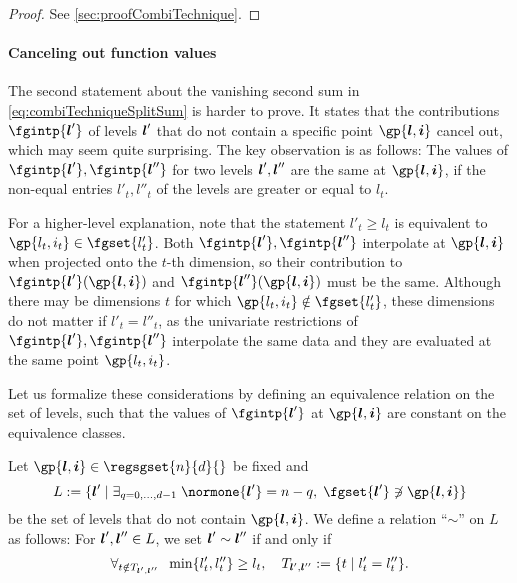 \begin{proof}
  See \cref{sec:proofCombiTechnique}.
\end{proof}

\paragraph{Canceling out function values}

The second statement about the vanishing second sum in
\eqref{eq:combiTechniqueSplitSum} is harder to prove.
It states that the contributions $\fgintp{\*l'}$ of levels ${\boldsymbol{l}}'$
that do not contain a specific point $\gp{\*l,\*i}$ cancel out,
which may seem quite surprising.
The key observation is as follows:
The values of $\fgintp{\*l'}, \fgintp{\*l''}$ for two levels
${\boldsymbol{l}}', {\boldsymbol{l}}''$ are the same at $\gp{\*l,\*i}$,
if the non-equal entries $l'_t, l''_t$ of the levels are
greater or equal to $l_t$.

For a higher-level explanation,
note that the statement $l'_t \ge l_t$ is equivalent to
$\gp{l_t,i_t} \in \fgset{l'_t}$.
Both $\fgintp{\*l'}, \fgintp{\*l''}$ interpolate at
$\gp{\*l,\*i}$ when projected onto the $t$-th dimension,
so their contribution to $\fgintp{\*l'}(\gp{\*l,\*i})$ and
$\fgintp{\*l''}(\gp{\*l,\*i})$ must be the same.
Although there may be dimensions $t$ for which
$\gp{l_t,i_t} \notin \fgset{l'_t}$,
these dimensions do not matter if $l'_t = l''_t$,
as the univariate restrictions of $\fgintp{\*l'}, \fgintp{\*l''}$
interpolate the same data and they are evaluated at the same point
$\gp{l_t,i_t}$.

Let us formalize these considerations by defining an
equivalence relation on the set of levels, such that the values of
$\fgintp{\*l'}$ at $\gp{\*l,\*i}$ are constant
on the equivalence classes.

\begin{definition}
  \label{def:combiTechniqueEquivalenceRelation}
  Let $\gp{\*l,\*i} \in \regsgset{n}{d}{}$ be fixed and
  \begin{equation}
    \label{eq:combiTechniqueSpecialLevelSet}
    L
    := \{\*l' \mid \ex{q=0,\dotsc,d-1}{
      \normone{\*l'} = n - q,\; \fgset{\*l'} \notni \gp{\*l,\*i}
    }\}
  \end{equation}
  be the set of levels that do not contain $\gp{\*l,\*i}$.
  We define a relation ``$\sim$'' on $L$ as follows:
  For ${\boldsymbol{l}}', {\boldsymbol{l}}'' \in L$, we set ${\boldsymbol{l}}' \sim {\boldsymbol{l}}''$ if and only if
  \begin{equation}
    \forall_{t \notin T_{{\boldsymbol{l}}',{\boldsymbol{l}}''}}\;\;\min\{l'_t, l''_t\} \ge l_t,\quad
    T_{{\boldsymbol{l}}',{\boldsymbol{l}}''}
    := \{t \mid l'_t = l''_t\}.
  \end{equation}
\end{definition}

